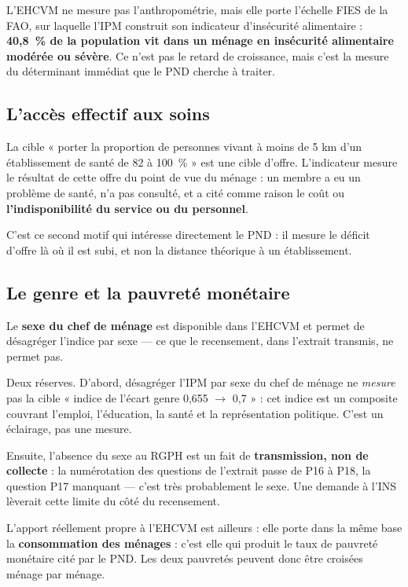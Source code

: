 \documentclass[11pt,a4paper]{article}
\begin{document}
L'EHCVM ne mesure pas l'anthropométrie, mais elle porte l'échelle FIES de la FAO, sur laquelle
l'IPM construit son indicateur d'insécurité alimentaire : \textbf{40,8~\% de la population vit dans
un ménage en insécurité alimentaire modérée ou sévère}. Ce n'est pas le retard de croissance, mais
c'est la mesure du déterminant immédiat que le PND cherche à traiter.

\subsection{L'accès effectif aux soins}

La cible « porter la proportion de personnes vivant à moins de 5 km d'un établissement de santé de
82 à 100~\% » est une cible d'offre. L'indicateur  mesure le résultat de
cette offre du point de vue du ménage : un membre a eu un problème de santé, n'a pas consulté, et
a cité comme raison le coût ou \textbf{l'indisponibilité du service ou du personnel}.

C'est ce second motif qui intéresse directement le PND : il mesure le déficit d'offre là où il est
subi, et non la distance théorique à un établissement.

\subsection{Le genre et la pauvreté monétaire}

Le \textbf{sexe du chef de ménage} est disponible dans l'EHCVM et permet de désagréger l'indice
par sexe --- ce que le recensement, dans l'extrait transmis, ne permet pas.

\begin{attention}
Deux réserves. D'abord, désagréger l'IPM par sexe du chef de ménage ne \emph{mesure} pas la cible
« indice de l'écart genre 0,655 $\to$ 0,7 » : cet indice est un composite couvrant l'emploi,
l'éducation, la santé et la représentation politique. C'est un éclairage, pas une mesure.

Ensuite, l'absence du sexe au RGPH est un fait de \textbf{transmission, non de collecte} : la
numérotation des questions de l'extrait passe de P16 à P18, la question P17 manquant --- c'est
très probablement le sexe. Une demande à l'INS lèverait cette limite du côté du recensement.
\end{attention}

L'apport réellement propre à l'EHCVM est ailleurs : elle porte dans la même base la \textbf{consommation des ménages} : c'est elle qui
produit le taux de pauvreté monétaire cité par le PND. Les deux pauvretés peuvent donc être
croisées ménage par ménage.
\end{document}

